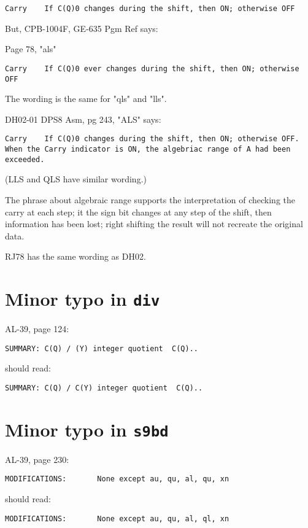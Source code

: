 \documentclass[notitlepage]{report}
\begin{document}
\begin{verbatim}
Carry    If C(Q)0 changes during the shift, then ON; otherwise OFF
\end{verbatim}

But, CPB-1004F, GE-635 Pgm Ref says:

Page 78, "als"

\begin{verbatim}
Carry    If C(Q)0 ever changes during the shift, then ON; otherwise OFF
\end{verbatim}

The wording is the same for "qls" and "lls".

DH02-01 DPS8 Asm, pg 243, "ALS" says:

\begin{verbatim}
Carry    If C(Q)0 changes during the shift, then ON; otherwise OFF. When the Carry indicator is ON, the algebriac range of A had been exceeded.
\end{verbatim}

(LLS and QLS have similar wording.)

The phrase about algebraic range supports the interpretation of checking the carry at each step; it the sign bit changes at any step of the shift, then information has been lost; right shifting the result will not recreate the original data.

RJ78 has the same wording as DH02.

\section{Minor typo in \texttt{div}}

AL-39, page 124:

\begin{verbatim}
SUMMARY: C(Q) / (Y) integer quotient  C(Q)..
\end{verbatim}

should read:

\begin{verbatim}
SUMMARY: C(Q) / C(Y) integer quotient  C(Q)..
\end{verbatim}

\section{Minor typo in \texttt{s9bd}}

AL-39, page 230:

\begin{verbatim}
MODIFICATIONS:       None except au, qu, al, qu, xn
\end{verbatim}

should read:

\begin{verbatim}
MODIFICATIONS:       None except au, qu, al, ql, xn
\end{verbatim}
\end{document}
